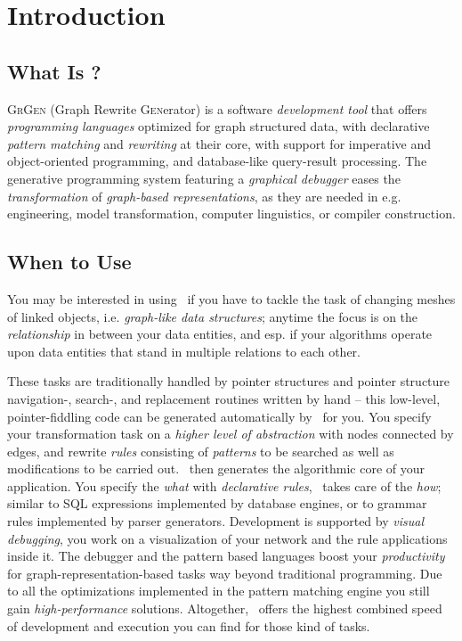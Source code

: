 \chapter{Introduction}
\label{chp:intro}


\section{What Is \GrG?}

{\scshape GrGen} (\textsc{G}raph \textsc{R}ewrite \textsc{Gen}erator) is a software \emph{development tool} that offers \emph{programming languages} optimized for graph structured data, with declarative \emph{pattern matching} and \emph{rewriting} at their core, with support for imperative and object-oriented programming, and database-like query-result processing.
The generative programming system featuring a \emph{graphical debugger} eases the \emph{transformation} of \emph{graph-based representations}, as they are needed in e.g. engineering, model transformation, computer linguistics, or compiler construction.

\section{When to Use \GrG}
You may be interested in using \GrG\ if you have to tackle the task of changing meshes of linked objects, i.e. \emph{graph-like data structures};
anytime the focus is on the \emph{relationship} in between your data entities,
and esp. if your algorithms operate upon data entities that stand in multiple relations to each other.

These tasks are traditionally handled by pointer structures and pointer structure navi\-gation-, search-, and replacement routines written by hand
-- this low-level, pointer-fiddling code can be generated automatically by \GrG\ for you.
You specify your transformation task on a \emph{higher level of abstraction} with nodes connected by edges,
and rewrite \emph{rules} consisting of \emph{patterns} to be searched as well as modifications to be carried out.
\GrG\ then generates the algorithmic core of your application.
You specify the \emph{what} with \emph{declarative rules}, \GrG\ takes care of the \emph{how};
similar to SQL expressions implemented by database engines, 
or to grammar rules implemented by parser generators.
Development is supported by \emph{visual debugging}, you work on a visualization of your network and the rule applications inside it.
The debugger and the pattern based languages boost your \emph{productivity} for graph-representation-based tasks way beyond traditional programming.
Due to all the optimizations implemented in the pattern matching engine you still gain \emph{high-performance} solutions.
Altogether, \GrG\ offers the highest combined speed of development and execution you can find for those kind of tasks.

